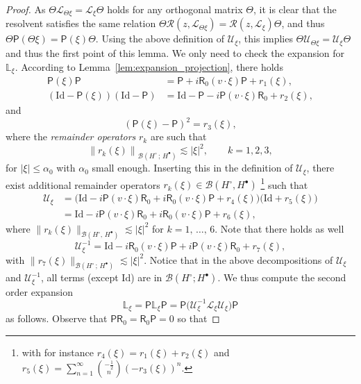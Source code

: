 \documentclass[AHL,Unicode,longabstracts,published]{cedram}
\newcommand{\Id}{\mathrm{Id}}
\newcommand{\sfR}{\mathsf{R}}
\newcommand{\rectL}{\mathbb{L}}
\newcommand{\LL}{\mathcal{L}}
\newcommand{\PP}{\mathsf{P}}
\newcommand{\RR}{\mathcal{R}}
\newcommand{\UU}{\mathcal{U}}
\newcommand{\BBB}{\mathscr{B}}
\newcommand{\Ssp}{H^{\bullet}}
\newcommand{\Ssm}{H^{\circ}}
\renewcommand*\le{\leqslant}
\begin{document}
\begin{proof}
As $\Theta \LL_{\Theta \xi} = \LL_\xi \Theta$ holds for any orthogonal matrix $\Theta$, it is clear that the resolvent satisfies the same relation $\Theta \RR(z, \LL_{\Theta \xi})= \RR(z,\LL_\xi)\Theta$, and thus $\Theta \PP(\Theta \xi) = \PP(\xi) \Theta$. Using the above definition of $\UU_{\xi}$, this implies $\Theta \UU_{\Theta \xi} = \UU_{\xi} \Theta$ and thus the first point of this lemma. We only need to check the expansion for $\rectL_{ \xi}$. According to Lemma~\ref{lem:expansion_projection}, there holds
\begin{align*}
\PP(\xi) \PP &= \PP +i \sfR_{0} (v \cdot \xi) \PP + r_{1}(\xi), \\
(\Id - \PP(\xi))(\Id - \PP) &= \Id - \PP - i \PP (v \cdot \xi) \sfR_{0} + r_{2}(\xi),
\end{align*}
and
\[
(\PP(\xi) - \PP)^2=r_{3}(\xi),
\]
where the \emph{remainder operators} $r_{k}$ are such that
\[
\left\|r_{k}(\xi)\right\|_{\BBB(\Ssm\,;\,\Ssp)} \lesssim |\xi|^{2}, \qquad k=1,2,3,
\]
for $|\xi| \le \alpha_0$ with $\alpha_0$ small enough. Inserting this in the definition of $\UU_{\xi}$, there exist additional remainder operators $r_{k}(\xi) \in \BBB(\Ssm,\Ssp)$ \footnote{with for instance $r_{4}(\xi)=r_{1}(\xi)+r_{2}(\xi)$ and $r_{5}(\xi)=\sum_{n=1}^{\infty}\binom{-\frac{1}{2}}{n}(-r_{3}(\xi))^{n}.$} such that
\begin{equation}\label{eq:expansion_Kato_isomorphism}
\begin{split}
\UU_\xi & = \Big(\Id - i \PP (v \cdot \xi)\sfR_{0} + i\sfR_{0} (v \cdot \xi) \PP + r_{4}(\xi) \Big) \Big(\Id + r_{5}(\xi) \Big) \\
& = \Id - i \PP (v \cdot \xi)\sfR_{0} + i\sfR_{0} (v \cdot \xi) \PP + r_{6}(\xi),
\end{split}
\end{equation}
where $\|r_{k}(\xi)\|_{\BBB(\Ssm,\,\Ssp)} \lesssim |\xi|^{2}$ for $k=1,\,\ldots,\,6$. Note that there holds as well
\begin{equation*}\label{eq:expansion_Kato_isomorphism_inverse}
\UU^{-1}_\xi = \Id - i\sfR_{0} (v \cdot \xi) \PP + i \PP (v \cdot \xi)\sfR_{0} + r_{7}(\xi),
\end{equation*}
with $\|r_{7}(\xi)\|_{\BBB(\Ssm\,;\,\Ssp)} \lesssim |\xi|^{2}.$ Notice that in the above decompositions of $\UU_{\xi}$ and $\UU_{\xi}^{-1}$, all terms (except $\Id$) are in $\BBB(\Ssm ; \Ssp)$. We thus compute the second order expansion
\[
\rectL_\xi =\PP \rectL_\xi \PP=\PP \Big(\UU^{-1}_\xi \LL_\xi \UU_\xi\Big) \PP
\]
as follows. Observe that $\PP \sfR_{0}=\sfR_{0}\PP=0$ so that

\end{proof}
\end{document}
